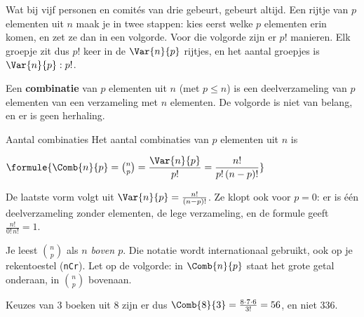 Wat bij vijf personen en comités van drie gebeurt, gebeurt altijd. Een rijtje van $p$ elementen uit $n$ maak je in twee stappen: kies eerst welke $p$ elementen erin komen, en zet ze dan in een volgorde. Voor die volgorde zijn er $p!$ manieren. Elk groepje zit dus $p!$ keer in de $\Var{n}{p}$ rijtjes, en het aantal groepjes is $\Var{n}{p} : p!$.

\begin{theorie}
Een \textbf{\textcolor{accent}{combinatie}} van $p$ elementen uit $n$ (met $p \leqslant n$) is een deelverzameling van $p$ elementen van een verzameling met $n$ elementen. De volgorde is niet van belang, en er is geen herhaling.

\begin{stelling}{Aantal combinaties}
Het aantal combinaties van $p$ elementen uit $n$ is

\vspace{1mm}
\qquad $\formule{\Comb{n}{p} = \binom{n}{p} = \dfrac{\Var{n}{p}}{p!} = \dfrac{n!}{p!\,(n - p)!}}$
\end{stelling}
\end{theorie}

De laatste vorm volgt uit $\Var{n}{p} = \frac{n!}{(n - p)!}$. Ze klopt ook voor $p = 0$: er is één deelverzameling zonder elementen, de lege verzameling, en de formule geeft $\frac{n!}{0!\,n!} = 1$.

Je leest $\binom{n}{p}$ als \textit{$n$ boven $p$}. Die notatie wordt internationaal gebruikt, ook op je rekentoestel (\texttt{nCr}). Let op de volgorde: in $\Comb{n}{p}$ staat het grote getal onderaan, in $\binom{n}{p}$ bovenaan.

Keuzes van 3 boeken uit 8 zijn er dus $\Comb{8}{3} = \frac{8 \cdot 7 \cdot 6}{3!} = 56$, en niet 336.



